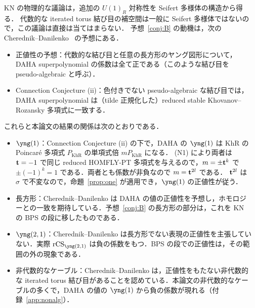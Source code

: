 KN の物理的な議論は，追加の $U(1)_R$ 対称性を Seifert 多様体の構造から得る．
代数的な iterated torus 結び目の補空間は一般に Seifert 多様体ではないので，この議論は直接は当てはまらない．
予想~\ref{conj:B} の動機は，次の Cherednik--Danilenko~\cite{Cherednik14} の予想にある．
\begin{itemize}
\item 正値性の予想：代数的な結び目と任意の長方形のヤング図形について，DAHA superpolynomial の係数は全て正である（このような結び目を pseudo-algebraic と呼ぶ）．
\item Connection Conjecture (ii)：色付きでない pseudo-algebraic な結び目では，DAHA superpolynomial は（tilde 正規化した）reduced stable Khovanov--Rozansky 多項式に一致する．
\end{itemize}
これらと本論文の結果の関係は次のとおりである．
\begin{itemize}
\item $\yng(1)$：Connection Conjecture (ii) の下で，DAHA の $\yng(1)$ は KhR の Poincaré 多項式 $P_{\mathrm{KhR}}$ の単項式倍 $mP_{\mathrm{KhR}}$ になる．
(N1) により両者は $\mathbf{t}=-1$ で同じ reduced HOMFLY-PT 多項式を与えるので，$m=\pm\mathbf{t}^k$ で $\pm(-1)^k=1$ である．両者とも係数が非負なので $m=\mathbf{t}^{2l}$ である．
$\mathbf{t}^{2l}$ は $\sigma$ で不変なので，命題~\ref{prop:one} が適用でき，$\yng(1)$ の正値性が従う．
\item 長方形：Cherednik--Danilenko は DAHA の値の正値性を予想し，ホモロジーとの一致を期待している．予想~\ref{conj:B} の長方形の部分は，これを KN の BPS の段に移したものである．
\item $\yng(2,1)$：Cherednik--Danilenko は長方形でない表現の正値性を主張していない．実際 $\rCS_{\yng(2,1)}$ は負の係数をもつ．BPS の段での正値性は，その範囲の外の現象である．
\item 非代数的なケーブル：Cherednik--Danilenko は，正値性をもたない非代数的な iterated torus 結び目があることを認めている．本論文の非代数的なケーブルの多くで，DAHA の値の $\yng(1)$ から負の係数が現れる（付録~\ref{app:nonalg}）．
\end{itemize}

